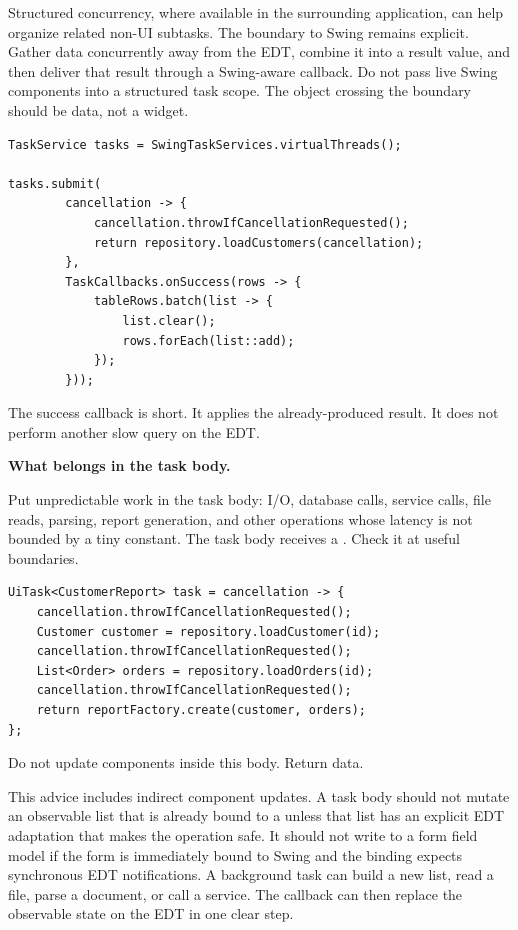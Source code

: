 Structured concurrency, where available in the surrounding application, can
help organize related non-UI subtasks. The boundary to Swing remains explicit.
Gather data concurrently away from the EDT, combine it into a result value, and
then deliver that result through a Swing-aware callback. Do not pass live Swing
components into a structured task scope. The object crossing the boundary should
be data, not a widget.

\begin{lstlisting}[caption={Virtual-thread work with Swing callback delivery.}]
TaskService tasks = SwingTaskServices.virtualThreads();

tasks.submit(
        cancellation -> {
            cancellation.throwIfCancellationRequested();
            return repository.loadCustomers(cancellation);
        },
        TaskCallbacks.onSuccess(rows -> {
            tableRows.batch(list -> {
                list.clear();
                rows.forEach(list::add);
            });
        }));
\end{lstlisting}

The success callback is short. It applies the already-produced result. It does
not perform another slow query on the EDT.

\textbf{What belongs in the task body.}

Put unpredictable work in the task body: I/O, database calls, service calls,
file reads, parsing, report generation, and other operations whose latency is
not bounded by a tiny constant. The task body receives a
. Check it at useful boundaries.

\begin{lstlisting}[caption={Task body with cancellation boundaries.}]
UiTask<CustomerReport> task = cancellation -> {
    cancellation.throwIfCancellationRequested();
    Customer customer = repository.loadCustomer(id);
    cancellation.throwIfCancellationRequested();
    List<Order> orders = repository.loadOrders(id);
    cancellation.throwIfCancellationRequested();
    return reportFactory.create(customer, orders);
};
\end{lstlisting}

Do not update components inside this body. Return data.

This advice includes indirect component updates. A task body should not mutate
an observable list that is already bound to a  unless that list has
an explicit EDT adaptation that makes the operation safe. It should not write
to a form field model if the form is immediately bound to Swing and the binding
expects synchronous EDT notifications. A background task can build a new list,
read a file, parse a document, or call a service. The callback can then replace
the observable state on the EDT in one clear step.

